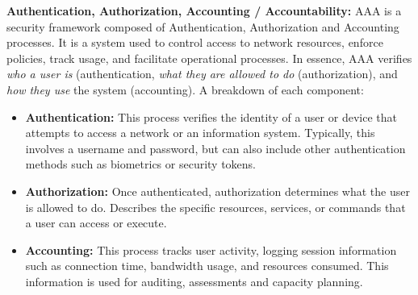  \textbf{Authentication, Authorization, Accounting / Accountability:} AAA is a security framework composed of Authentication, Authorization and Accounting processes. It is a system used to control access to network resources, enforce policies, track usage, and facilitate operational processes. In essence, AAA verifies \textit{who a user is} (authentication, \textit{what they are allowed to do} (authorization), and \textit{how they use} the system (accounting). A breakdown of each component:
\begin{itemize}
    \item \textbf{Authentication:} This process verifies the identity of a user or device that attempts to access a network or an information system. Typically, this involves a username and password, but can also include other authentication methods such as biometrics or security tokens.
    \item \textbf{Authorization:} Once authenticated, authorization determines what the user is allowed to do. Describes the specific resources, services, or commands that a user can access or execute.
    \item \textbf{Accounting:} This process tracks user activity, logging session information such as connection time, bandwidth usage, and resources consumed. This information is used for auditing, assessments and capacity planning.
\end{itemize}

